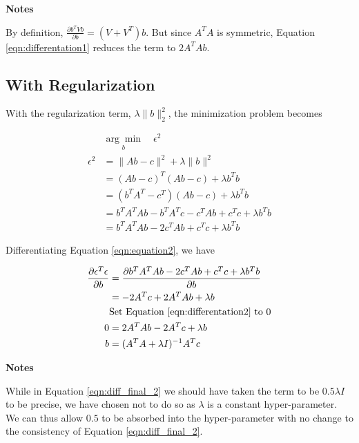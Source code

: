 \documentclass[]{article}
\begin{document}
\textbf{Notes}

By definition, $\frac{\partial b^TVb}{\partial b} = (V + V^T)b$. But since $A^TA$ is symmetric, Equation \ref{eqn:differentation1} reduces the term to $2A^TAb$.

\subsection{With Regularization}

With the regularization term, $\lambda\|b\|^2_2$, the minimization problem becomes

\begin{align}
&\underset{b}{\arg\min} \quad \epsilon^2 \nonumber \\
\epsilon^2 &= \| Ab - c \|^2 + \lambda \| b \|^2 \nonumber \\
&= (Ab - c)^T(Ab - c) + \lambda b^Tb \nonumber \\
&= (b^TA^T - c^T)(Ab - c) + \lambda b^Tb \nonumber \\
&= b^TA^TAb - b^TA^Tc - c^TAb + c^Tc + \lambda b^Tb \nonumber \\
&= b^TA^TAb - 2c^TAb + c^Tc + \lambda b^Tb \label{eqn:equation2}
\end{align}

Differentiating Equation \ref{eqn:equation2}, we have

\begin{align}
\frac{\partial \epsilon^T\epsilon}{\partial b} 
	&= \frac{\partial b^TA^TAb - 2c^TAb + c^Tc + \lambda b^Tb}
		{\partial b} \nonumber \\
&= -2A^Tc + 2A^TAb + \lambda b \label{eqn:differentation2}\\
&\text{Set Equation \ref{eqn:differentation2} to 0} \nonumber \\ 
0 &= 2A^TAb - 2A^Tc + \lambda b \nonumber \\
b &= (A^TA + \lambda I)^{-1}A^Tc \label{eqn:diff_final_2}
\end{align}

\textbf{Notes} 

While in Equation \ref{eqn:diff_final_2} we should have taken the term to be $0.5\lambda I$ to be precise, we have chosen not to do so as $\lambda$ is a constant hyper-parameter. We can thus allow $0.5$ to be absorbed into the hyper-parameter with no change to the consistency of Equation \ref{eqn:diff_final_2}.
\end{document}
